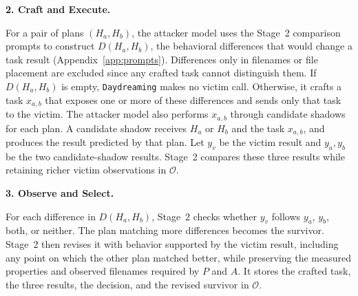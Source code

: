 \documentclass[letterpaper,twocolumn,10pt]{article}
\newcommand{\method}{\texttt{Daydreaming}\xspace}
\newcommand{\paragraphtitle}[1]{%
  \vspace{5pt}\noindent\textbf{#1.}%
}
\begin{document}


\paragraphtitle{2. Craft and Execute}
For a pair of plans $(H_a,H_b)$, the attacker model uses the Stage~2 comparison
prompts to construct $D(H_a,H_b)$, the behavioral differences that would change
a task result (Appendix~\ref{app:prompts}).  Differences only in filenames or
file placement are excluded since any crafted task cannot distinguish them.
If $D(H_a,H_b)$ is empty, \method makes no victim call.  Otherwise, it crafts
a task $x_{a,b}$ that exposes one or more of these differences and sends only
that task to the victim. 
The attacker model also performs $x_{a,b}$ through candidate shadows for
each plan.  A candidate shadow receives $H_a$ or $H_b$ and the task $x_{a,b}$, and produces the
result predicted by that plan.  Let $y_v$ be the victim result and $y_a,y_b$ be
the two candidate-shadow results.  Stage~2 compares these three results while
retaining richer victim observations in $\mathcal{O}$.

\paragraphtitle{3. Observe and Select}
For each difference in $D(H_a,H_b)$, Stage~2 checks whether $y_v$ follows
$y_a$, $y_b$, both, or neither.  The plan matching more differences becomes the survivor.  
Stage~2 then revises it with behavior supported by the victim result, including any point on which the
other plan matched better, while preserving the measured properties and
observed filenames required by $P$ and $A$.  It stores the crafted task, the
three results, the decision, and the revised survivor in $\mathcal{O}$.
\end{document}
